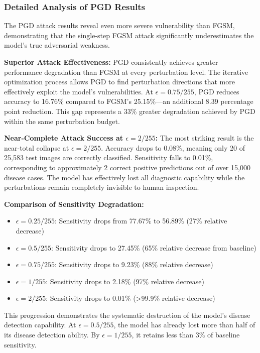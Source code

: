 \documentclass[12pt,a4paper]{article}
\begin{document}
\subsubsection{Detailed Analysis of PGD Results}

The PGD attack results reveal even more severe vulnerability than FGSM, demonstrating that the single-step FGSM attack significantly underestimates the model's true adversarial weakness.

\textbf{Superior Attack Effectiveness:} PGD consistently achieves greater performance degradation than FGSM at every perturbation level. The iterative optimization process allows PGD to find perturbation directions that more effectively exploit the model's vulnerabilities. At $\epsilon=0.75/255$, PGD reduces accuracy to 16.76\% compared to FGSM's 25.15\%---an additional 8.39 percentage point reduction. This gap represents a 33\% greater degradation achieved by PGD within the same perturbation budget.

\textbf{Near-Complete Attack Success at $\epsilon=2/255$:} The most striking result is the near-total collapse at $\epsilon=2/255$. Accuracy drops to 0.08\%, meaning only 20 of 25,583 test images are correctly classified. Sensitivity falls to 0.01\%, corresponding to approximately 2 correct positive predictions out of over 15,000 disease cases. The model has effectively lost all diagnostic capability while the perturbations remain completely invisible to human inspection.

\textbf{Comparison of Sensitivity Degradation:}
\begin{itemize}[leftmargin=*]
    \item $\epsilon=0.25/255$: Sensitivity drops from 77.67\% to 56.89\% (27\% relative decrease)
    \item $\epsilon=0.5/255$: Sensitivity drops to 27.45\% (65\% relative decrease from baseline)
    \item $\epsilon=0.75/255$: Sensitivity drops to 9.23\% (88\% relative decrease)
    \item $\epsilon=1/255$: Sensitivity drops to 2.18\% (97\% relative decrease)
    \item $\epsilon=2/255$: Sensitivity drops to 0.01\% (>99.9\% relative decrease)
\end{itemize}

This progression demonstrates the systematic destruction of the model's disease detection capability. At $\epsilon=0.5/255$, the model has already lost more than half of its disease detection ability. By $\epsilon=1/255$, it retains less than 3\% of baseline sensitivity.
\end{document}
